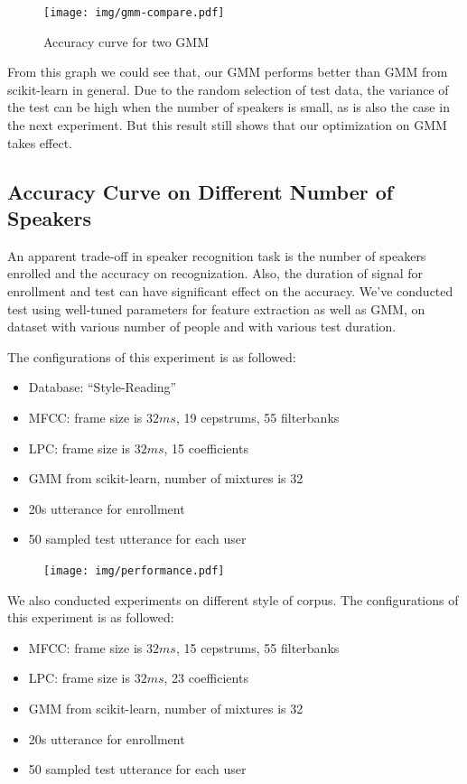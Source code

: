 \begin{figure}[!ht]
	\centering
	\texttt{[image: img/gmm-compare.pdf]}
	\caption{Accuracy curve for two GMM}
\end{figure}

From this graph we could see that, our GMM performs better than GMM from scikit-learn in general.
Due to the random selection of test data,
the variance of the test can be high when the number of speakers is small,
as is also the case in the next experiment. But this result still shows that
our optimization on GMM takes effect.

\subsection{Accuracy Curve on Different Number of Speakers}

An apparent trade-off in speaker recognition task is the number of speakers
enrolled and the accuracy on recognization.
Also, the duration of signal for enrollment and test can have significant effect on the accuracy.
We've conducted test using well-tuned parameters for feature extraction as well as GMM, on dataset with
various number of people and with various test duration.

The configurations of this experiment is as followed:
\begin{itemize}
  \item Database: ``Style-Reading''
  \item MFCC: frame size is $32 ms $, 19 cepstrums, 55 filterbanks
  \item LPC: frame size is $32 ms $, 15 coefficients
  \item GMM from scikit-learn, number of mixtures is 32
  \item 20s utterance for enrollment
  \item 50 sampled test utterance for each user
\end{itemize}

\begin{figure}[H]
  \centering
  \texttt{[image: img/performance.pdf]}
\end{figure}

We also conducted experiments on different style of corpus.
The configurations of this experiment is as followed:
\begin{itemize}
  \item MFCC: frame size is $32 ms $, 15 cepstrums, 55 filterbanks
  \item LPC: frame size is $32 ms $, 23 coefficients
  \item GMM from scikit-learn, number of mixtures is 32
  \item 20s utterance for enrollment
  \item 50 sampled test utterance for each user
\end{itemize}

